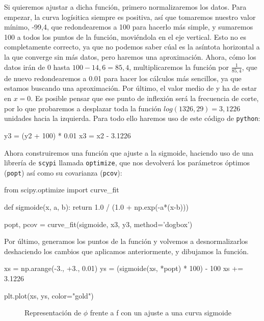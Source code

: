 \documentclass[12pt, a4paper, titlepage]{article}
\newcommand{\code}[1]{\texttt{#1}} %
\begin{document}
  Si quieremos ajustar a dicha función, primero normalizaremos los datos. Para empezar, la curva logísitica siempre es positiva, así que tomaremos nuestro valor mínimo, -99,4, que redondearemos a 100 para hacerlo más simple, y sumaremos 100 a todos los puntos de la función, moviéndola en el eje vertical. Esto no es completamente correcto, ya que no podemos saber cúal es la asíntota horizontal a la que converge sin más datos, pero haremos una aproximación. Ahora, cómo los datos irán de 0 hasta $100-14,6=85,4$, multiplicaremos la función por $\frac{1}{85,4}$, que de nuevo redondearemos a 0.01 para hacer los cálculos más sencillos, ya que estamos buscando una aproximación. Por último, el valor medio de y ha de estar en $x=0$. Es posible pensar que ese punto de inflexión será la frecuencia de corte, por lo que probaremos a desplazar toda la función $log(1326,29) = 3,1226$ unidades hacia la izquierda. Para todo ello haremos uso de este código de \code{python}:

  \begin{python}
    y3 = (y2 + 100) * 0.01
    x3 = x2 - 3.1226
  \end{python}

  Ahora construiremos una función que ajuste a la sigmoide, haciendo uso de una librería de \code{scypi} llamada \code{optimize}, que nos devolverá los parámetros óptimos (\code{popt}) así como su covarianza (\code{pcov}):

  \begin{python}
    from scipy.optimize import curve_fit

    def sigmoide(x, a, b):
        return 1.0 / (1.0 + np.exp(-a*(x-b)))

    popt, pcov = curve_fit(sigmoide, x3, y3, method='dogbox')
  \end{python}

  Por último, generamos los puntos de la función y volvemos a desnormalizarlos deshaciendo los cambios que aplicamos anteriormente, y dibujamos la función.

  \begin{python}
    xs = np.arange(-3., +3., 0.01)
    ys = (sigmoide(xs, *popt) * 100) - 100
    xs += 3.1226

    plt.plot(xs, ys, color="gold")
  \end{python}

  \begin{figure}[H]
    \hspace{2.5em} 
    \caption{Representación de $\phi$ frente a f con un ajuste a una curva sigmoide}
  \end{figure}
\end{document}
